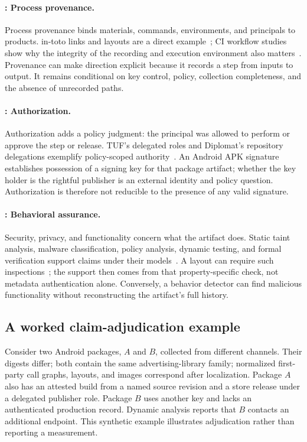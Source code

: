 \paragraph{: Process provenance.}
Process provenance binds materials, commands, environments, and principals to products. in-toto links and layouts are a direct example~\cite{intoto}; CI workflow studies show why the integrity of the recording and execution environment also matters~\cite{githubci}. Provenance can make direction explicit because it records a step from inputs to output. It remains conditional on key control, policy, collection completeness, and the absence of unrecorded paths.

\paragraph{: Authorization.}
Authorization adds a policy judgment: the principal was allowed to perform or approve the step or release. TUF's delegated roles and Diplomat's repository delegations exemplify policy-scoped authority~\cite{tuf,diplomat}. An Android APK signature establishes possession of a signing key for that package artifact; whether the key holder is the rightful publisher is an external identity and policy question. Authorization is therefore not reducible to the presence of any valid signature.

\paragraph{: Behavioral assurance.}
Security, privacy, and functionality concern what the artifact does. Static taint analysis, malware classification, policy analysis, dynamic testing, and formal verification support claims under their models~\cite{flowdroid,drebin,mamadroid}. A layout can require such inspections~\cite{intoto}; the support then comes from that property-specific check, not metadata authentication alone. Conversely, a behavior detector can find malicious functionality without reconstructing the artifact's full history.

\subsection{A worked claim-adjudication example}

Consider two Android packages, $A$ and $B$, collected from different channels. Their digests differ; both contain the same advertising-library family; normalized first-party call graphs, layouts, and images correspond after localization. Package $A$ also has an attested build from a named source revision and a store release under a delegated publisher role. Package $B$ uses another key and lacks an authenticated production record. Dynamic analysis reports that $B$ contacts an additional endpoint. This synthetic example illustrates adjudication rather than reporting a measurement.

